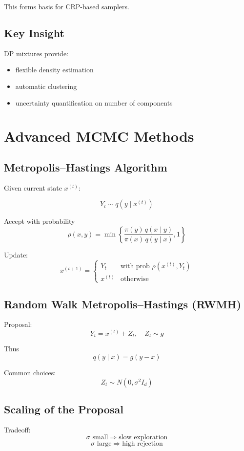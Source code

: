 \documentclass[12pt,oneside]{book}
\numberwithin{equation}{section}
\theoremstyle{definition}
\theoremstyle{plain}
\theoremstyle{remark}
\begin{document}
This forms basis for CRP-based samplers.

\subsection*{Key Insight}

DP mixtures provide:

\begin{itemize}
\item flexible density estimation
\item automatic clustering
\item uncertainty quantification on number of components
\end{itemize}

\section{Advanced MCMC Methods}

\subsection*{Metropolis--Hastings Algorithm}

Given current state $x^{(t)}$:

\[
Y_t \sim q(y \mid x^{(t)})
\]

Accept with probability
\[
\rho(x,y) = \min\left\{ \frac{\pi(y)\,q(x \mid y)}{\pi(x)\,q(y \mid x)}, 1 \right\}
\]

Update:
\[
x^{(t+1)} =
\begin{cases}
Y_t & \text{with prob } \rho(x^{(t)}, Y_t) \\
x^{(t)} & \text{otherwise}
\end{cases}
\]

\subsection{Random Walk Metropolis--Hastings (RWMH)}

Proposal:
\[
Y_t = x^{(t)} + Z_t, \quad Z_t \sim g
\]

Thus
\[
q(y \mid x) = g(y - x)
\]

Common choices:
\[
Z_t \sim N(0, \sigma^2 I_d)
\]

\subsection*{Scaling of the Proposal}

Tradeoff:
\[
\sigma \text{ small} \Rightarrow \text{slow exploration}
\]
\[
\sigma \text{ large} \Rightarrow \text{high rejection}
\]
\end{document}
